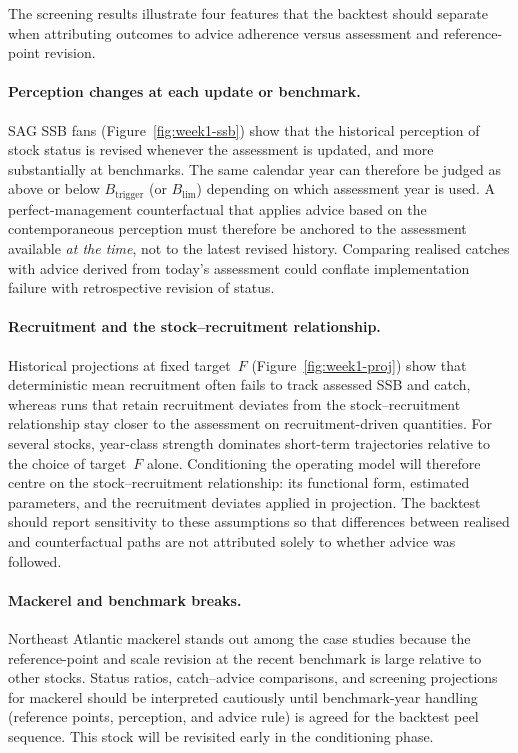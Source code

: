 \documentclass[11pt,a4paper]{extarticle}
\begin{document}
The screening results illustrate four features that the backtest should separate when attributing outcomes to advice adherence versus assessment and reference-point revision.

\paragraph{Perception changes at each update or benchmark.}
SAG SSB fans (Figure~\ref{fig:week1-ssb}) show that the historical perception
of stock status is revised whenever the assessment is updated, and more
substantially at benchmarks. The same calendar year can therefore be judged
as above or below \(B_{\mathrm{trigger}}\) (or \(B_{\lim}\)) depending on
which assessment year is used. A perfect-management counterfactual that
applies advice based on the contemporaneous perception must therefore be
anchored to the assessment available \emph{at the time}, not to the latest
revised history. Comparing realised catches with advice derived from today's
assessment could conflate implementation failure with retrospective revision
of status.

\paragraph{Recruitment and the stock--recruitment relationship.}
Historical projections at fixed target~\(F\) (Figure~\ref{fig:week1-proj})
show that deterministic mean recruitment often fails to track assessed SSB and
catch, whereas runs that retain recruitment deviates from the
stock--recruitment relationship stay closer to the assessment on
recruitment-driven quantities. For several stocks, year-class strength
dominates short-term trajectories relative to the choice of target~\(F\) alone.
Conditioning the operating model will therefore centre on the
stock--recruitment relationship: its functional form, estimated parameters, and
the recruitment deviates applied in projection. The backtest should report
sensitivity to these assumptions so that differences between realised and
counterfactual paths are not attributed solely to whether advice was followed.

\paragraph{Mackerel and benchmark breaks.}
Northeast Atlantic mackerel stands out among the case studies because the
reference-point and scale revision at the recent benchmark is large relative to
other stocks. Status ratios, catch--advice comparisons, and screening
projections for mackerel should be interpreted cautiously until benchmark-year
handling (reference points, perception, and advice rule) is agreed for the
backtest peel sequence. This stock will be revisited early in the conditioning
phase.
\end{document}
